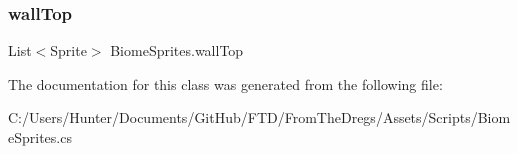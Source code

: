 \mbox{\label{class_biome_sprites_a4653b5307c630bec66c3b4c14f8d54f0}} 
\subsubsection{\texorpdfstring{wallTop}{wallTop}}
{\footnotesize\ttfamily List$<$Sprite$>$ Biome\+Sprites.\+wall\+Top}



The documentation for this class was generated from the following file\+:\begin{DoxyCompactItemize}
\item 
C\+:/\+Users/\+Hunter/\+Documents/\+Git\+Hub/\+F\+T\+D/\+From\+The\+Dregs/\+Assets/\+Scripts/Biome\+Sprites.\+cs\end{DoxyCompactItemize}
